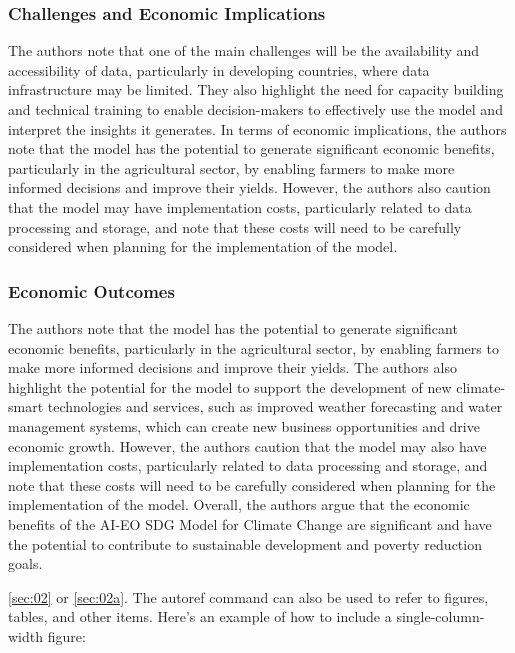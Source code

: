 \documentclass[draft, {\secondLanguage}, english]{volcanica-template}
\begin{document}
\subsubsection{Challenges and Economic Implications}
The authors note that one of the main challenges will be the availability and accessibility of data, particularly in developing countries, where data infrastructure may be limited. They also highlight the need for capacity building and technical training to enable decision-makers to effectively use the model and interpret the insights it generates. In terms of economic implications, the authors note that the model has the potential to generate significant economic benefits, particularly in the agricultural sector, by enabling farmers to make more informed decisions and improve their yields. However, the authors also caution that the model may have implementation costs, particularly related to data processing and storage, and note that these costs will need to be carefully considered when planning for the implementation of the model.

\subsubsection{Economic Outcomes}
The authors note that the model has the potential to generate significant economic benefits, particularly in the agricultural sector, by enabling farmers to make more informed decisions and improve their yields. The authors also highlight the potential for the model to support the development of new climate-smart technologies and services, such as improved weather forecasting and water management systems, which can create new business opportunities and drive economic growth. However, the authors caution that the model may also have implementation costs, particularly related to data processing and storage, and note that these costs will need to be carefully considered when planning for the implementation of the model. Overall, the authors argue that the economic benefits of the AI-EO SDG Model for Climate Change are significant and have the potential to contribute to sustainable development and poverty reduction goals.

\autoref{sec:02} or \autoref{sec:02a}. The autoref command can also be used to refer to figures, tables, and other items. Here's an example of how to include a single-column-width figure:
\end{document}
